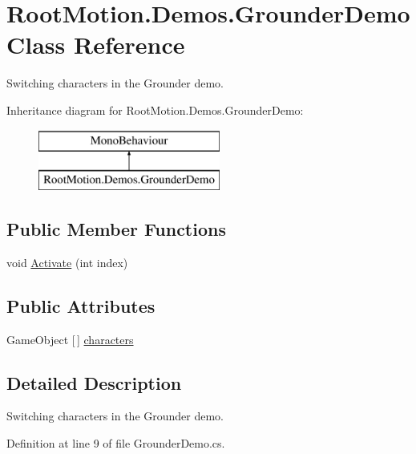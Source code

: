 \hypertarget{class_root_motion_1_1_demos_1_1_grounder_demo}{}\section{Root\+Motion.\+Demos.\+Grounder\+Demo Class Reference}
\label{class_root_motion_1_1_demos_1_1_grounder_demo}


Switching characters in the Grounder demo.  


Inheritance diagram for Root\+Motion.\+Demos.\+Grounder\+Demo\+:\begin{figure}[H]
\begin{center}
\leavevmode
\includegraphics[height=2.000000cm]{class_root_motion_1_1_demos_1_1_grounder_demo}
\end{center}
\end{figure}
\subsection*{Public Member Functions}
\begin{DoxyCompactItemize}
\item 
void \mbox{\hyperlink{class_root_motion_1_1_demos_1_1_grounder_demo_a4312958bfc47e6dfc497d03e876e1e10}{Activate}} (int index)
\end{DoxyCompactItemize}
\subsection*{Public Attributes}
\begin{DoxyCompactItemize}
\item 
Game\+Object \mbox{[}$\,$\mbox{]} \mbox{\hyperlink{class_root_motion_1_1_demos_1_1_grounder_demo_a8c9bed148bd1aa6dd6d494ccb064798d}{characters}}
\end{DoxyCompactItemize}


\subsection{Detailed Description}
Switching characters in the Grounder demo. 



Definition at line 9 of file Grounder\+Demo.\+cs.



